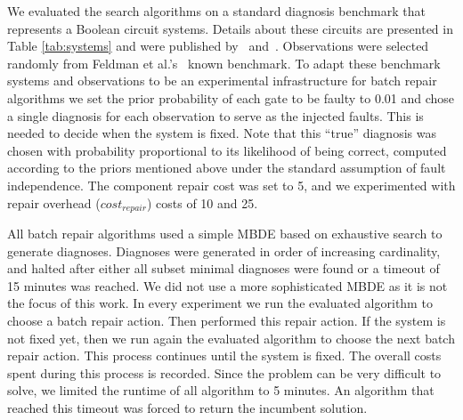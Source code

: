 \documentclass[review]{elsarticle}
\newcommand{\shortcite}{\cite}
\begin{document}
We evaluated the search algorithms on a standard diagnosis benchmark that represents a Boolean circuit systems. Details about these circuits are presented in Table \ref{tab:systems} and were published by~\cite{Hansen99} and~\cite{Brglez89}.  
Observations were selected randomly from Feldman et al.'s~\shortcite{feldman2010approximate} known benchmark.
To adapt these benchmark systems and observations to be an experimental infrastructure for batch repair algorithms we set the prior probability of each gate to be faulty to 0.01 and chose a single diagnosis for each observation to serve as the injected faults. This is needed to decide when the system is fixed. Note that this ``true'' diagnosis was chosen with probability proportional to its likelihood of being correct, computed according to the priors mentioned above under the standard assumption of fault independence. The component repair cost was set to 5, and we experimented with repair overhead ($cost_{repair}$) costs of 10 and 25.

All batch repair algorithms used a simple MBDE based on exhaustive search to generate diagnoses. Diagnoses were generated in order of increasing cardinality, and halted after either all subset minimal diagnoses were found or a timeout of 15 minutes was reached. We did not use a more sophisticated MBDE as it is not the focus of this work. 
In every experiment we run the evaluated algorithm to choose a batch repair action. Then performed this repair action. 
If the system is not fixed yet, then we run again the evaluated algorithm to choose the next batch repair action. This process continues until the system is fixed. The overall costs 
spent during this process is recorded. Since the \brps{} problem can be very difficult to solve, we limited the runtime of all algorithm to 5 minutes. 
An algorithm that reached this timeout was forced to return the incumbent solution. 

\end{document}
